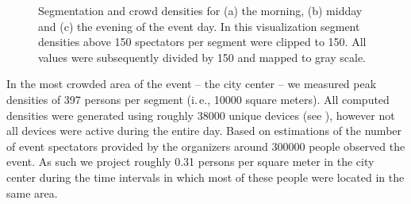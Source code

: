 \documentclass[12pt,a4paper,twoside,openright]{book}
\begin{document}
\begin{figure}
	\caption[Segmentation and crowd densities]{Segmentation and crowd densities for (a) the morning, (b) midday and (c) the evening of the event day. In this visualization segment densities above 150 spectators per segment were clipped to 150. All values were subsequently divided by 150 and mapped to gray scale.}
	\label{fig:segments}
\end{figure}

In the most crowded area of the event -- the city center -- we measured peak densities of 397 persons per segment (i.\,e., 10000 square meters).
%
All computed densities were generated using roughly 38000 unique devices (see ), however not all devices were active during the entire day.
%
Based on estimations of the number of event spectators provided by the organizers around 300000 people observed the event.
%
As such we project roughly 0.31 persons per square meter in the city center during the time intervals in which most of these people were located in the same area.
\end{document}
